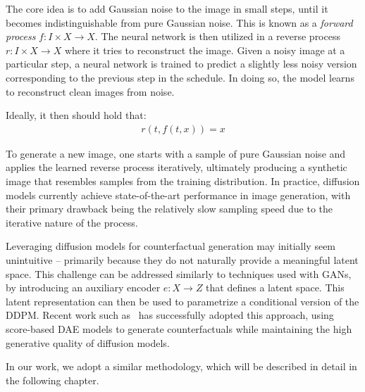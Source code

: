 The core idea is to add Gaussian noise to the image in small steps, until it becomes indistinguishable from pure Gaussian noise.
This is known as a \emph{forward process} $f : I \times X \to X$. The neural network is then utilized in a reverse process $r : I \times X \to X$ where it tries to reconstruct the image. Given a noisy image at a particular step, a neural network is trained to predict a slightly less noisy version corresponding to the previous step in the schedule. In doing so, the model learns to reconstruct clean images from noise.

Ideally, it then should hold that:
\begin{align*}
    r(t, f(t, x)) = x
\end{align*}

To generate a new image, one starts with a sample of pure Gaussian noise and applies the learned reverse process iteratively, ultimately producing a synthetic image that resembles samples from the training distribution. In practice, diffusion models currently achieve state-of-the-art performance in image generation, with their primary drawback being the relatively slow sampling speed due to the iterative nature of the process.

Leveraging diffusion models for counterfactual generation may initially seem unintuitive -- primarily because they do not naturally provide a meaningful latent space. This challenge can be addressed similarly to techniques used with GANs, by introducing an auxiliary encoder $e : X \to Z$ that defines a latent space. This latent representation can then be used to parametrize a conditional version of the DDPM. Recent work such as~\cite{atad2024counterfactual,vzigutyte2025counterfactual} has successfully adopted this approach, using score-based DAE models to generate counterfactuals while maintaining the high generative quality of diffusion models.

In our work, we adopt a similar methodology, which will be described in detail in the following chapter.